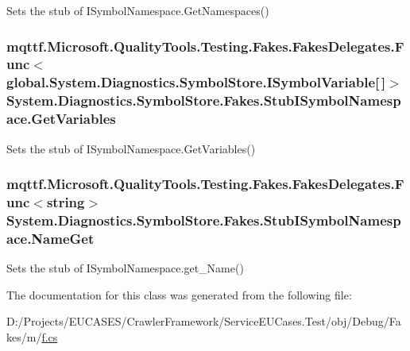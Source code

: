 Sets the stub of I\-Symbol\-Namespace.\-Get\-Namespaces()

\hypertarget{class_system_1_1_diagnostics_1_1_symbol_store_1_1_fakes_1_1_stub_i_symbol_namespace_aa3696fe4f4970b20c879d201dd471c97}{
\subsubsection[{Get\-Variables}]{\setlength{\rightskip}{0pt plus 5cm}mqttf.\-Microsoft.\-Quality\-Tools.\-Testing.\-Fakes.\-Fakes\-Delegates.\-Func$<$global.\-System.\-Diagnostics.\-Symbol\-Store.\-I\-Symbol\-Variable\mbox{[}$\,$\mbox{]}$>$ System.\-Diagnostics.\-Symbol\-Store.\-Fakes.\-Stub\-I\-Symbol\-Namespace.\-Get\-Variables}}\label{class_system_1_1_diagnostics_1_1_symbol_store_1_1_fakes_1_1_stub_i_symbol_namespace_aa3696fe4f4970b20c879d201dd471c97}


Sets the stub of I\-Symbol\-Namespace.\-Get\-Variables()

\hypertarget{class_system_1_1_diagnostics_1_1_symbol_store_1_1_fakes_1_1_stub_i_symbol_namespace_a30fe8de4860a9ce20e249c3a89d4db2f}{
\subsubsection[{Name\-Get}]{\setlength{\rightskip}{0pt plus 5cm}mqttf.\-Microsoft.\-Quality\-Tools.\-Testing.\-Fakes.\-Fakes\-Delegates.\-Func$<$string$>$ System.\-Diagnostics.\-Symbol\-Store.\-Fakes.\-Stub\-I\-Symbol\-Namespace.\-Name\-Get}}\label{class_system_1_1_diagnostics_1_1_symbol_store_1_1_fakes_1_1_stub_i_symbol_namespace_a30fe8de4860a9ce20e249c3a89d4db2f}


Sets the stub of I\-Symbol\-Namespace.\-get\-\_\-\-Name()



The documentation for this class was generated from the following file\-:\begin{DoxyCompactItemize}
\item 
D\-:/\-Projects/\-E\-U\-C\-A\-S\-E\-S/\-Crawler\-Framework/\-Service\-E\-U\-Cases.\-Test/obj/\-Debug/\-Fakes/m/\hyperlink{m_2f_8cs}{f.\-cs}\end{DoxyCompactItemize}
